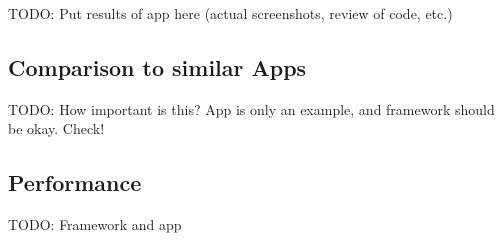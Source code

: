 TODO: Put results of app here (actual screenshots, review of code, etc.)

\subsection{Comparison to similar Apps}

TODO: How important is this?
App is only an example, and framework should be okay.
Check!

\subsection{Performance}

TODO: Framework and app
